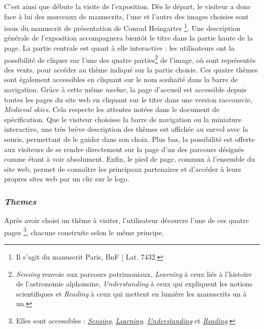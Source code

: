     C'est ainsi que débute la visite de l'exposition. Dès le départ, le visiteur a donc face à lui des morceaux de manuscrits, l'une et l'autre des images choisies sont issus du manuscrit de présentation de Conrad Heingarter \footnote{Il s'agit du manuscrit Paris, BnF | Lat. 7432.}. Une description générale de l'exposition accompagnera bientôt le titre dans la partie haute de la page. La partie centrale est quant à elle interactive : les utilisateurs ont la possibilité de cliquer sur l'une des quatre parties\footnote{\textit{Sensing} renvoie aux parcours patrimoniaux, \textit{Learning} à ceux liés à l'histoire de l'astronomie alphonsine, \textit{Understanding} à ceux qui expliquent les notions scientifiques et \textit{Reading} à ceux qui mettent en lumière les manuscrits un à un.} de l'image, où sont représentés des vents, pour accéder au thème indiqué sur la partie choisie. Ces quatre thèmes sont également accessibles en cliquant sur le nom souhaité dans la barre de navigation. Grâce à cette même \textit{navbar}, la page d'accueil est accessible depuis toutes les pages du site web en cliquant sur le titre dans une version raccourcie, \textit{Medieval skies}. Cela respecte les attentes notées dans le document de spécification. Que le visiteur choisisse la barre de navigation ou la miniature interactive, une très brève description des thèmes est affichée au survol avec la souris, permettant de le guider dans son choix. Plus bas, la possibilité est offerte aux visiteurs de se rendre directement sur la page d'un des parcours désignés comme étant à voir absolument. Enfin, le pied de page, commun à l'ensemble du site web, permet de connaître les principaux partenaires et d'accéder à leurs propres sites web par un clic sur le logo. 
    
    \subsubsection{\textit{Themes}}
    Après avoir choisi un thème à visiter, l'utilisateur découvre l'une de ces quatre pages \footnote{Elles sont accessibles : \href{https://alfa-exhibition.herokuapp.com/heritage}{\textit{Sensing}}, \href{https://alfa-exhibition.herokuapp.com/historical}{\textit{Learning}}, \href{https://alfa-exhibition.herokuapp.com/scientific}{\textit{Understanding}} et \href{https://alfa-exhibition.herokuapp.com/manuscripts}{\textit{Reading}}.}, chacune construite selon le même principe. 
    

